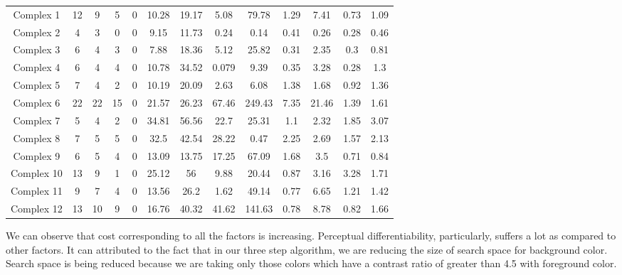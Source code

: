 \begin{table}[!htb]
\begin{tabular}{c c c c c c c c c c c c c}
Complex 1&12&9&5&0&10.28&19.17&5.08&79.78&1.29&7.41&0.73&1.09\\
Complex 2&4&3&0&0&9.15&11.73&0.24&0.14&0.41&0.26&0.28&0.46\\
Complex 3&6&4&3&0&7.88&18.36&5.12&25.82&0.31&2.35&0.3&0.81\\
Complex 4&6&4&4&0&10.78&34.52&0.079&9.39&0.35&3.28&0.28&1.3\\
Complex 5&7&4&2&0&10.19&20.09&2.63&6.08&1.38&1.68&0.92&1.36\\
Complex 6&22&22&15&0&21.57&26.23&67.46&249.43&7.35&21.46&1.39&1.61\\
Complex 7&5&4&2&0&34.81&56.56&22.7&25.31&1.1&2.32&1.85&3.07\\
Complex 8&7&5&5&0&32.5&42.54&28.22&0.47&2.25&2.69&1.57&2.13\\
Complex 9&6&5&4&0&13.09&13.75&17.25&67.09&1.68&3.5&0.71&0.84\\
Complex 10&13&9&1&0&25.12&56&9.88&20.44&0.87&3.16&3.28&1.71\\
Complex 11&9&7&4&0&13.56&26.2&1.62&49.14&0.77&6.65&1.21&1.42\\
Complex 12&13&10&9&0&16.76&40.32&41.62&141.63&0.78&8.78&0.82&1.66\\[1ex]
\hline
\end{tabular}
\label{table:nonlin}
\end{table}

We can observe that cost corresponding to all the factors is increasing. Perceptual differentiability, particularly, suffers a lot as compared to other factors. It can attributed to the fact that in our three step algorithm, we are reducing the size of search space for background color. Search space is being reduced because we are taking only those colors which have a contrast ratio of greater than 4.5 with foreground color.  
